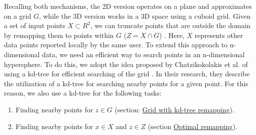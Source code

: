 Recalling both mechanisms, the 2D version operates on a plane and approximates on a grid $G$, while the 3D version works in a 3D space using a cuboid grid.
Given a set of input points $X \subset R^2$, we can truncate points that are outside the domain by remapping them to points within $G$ ($Z = X \cap G$) \citep{DBLP:journals/corr/abs-1212-1984}.
Here, $X$ represents other data points reported locally by the same user.
To extend this approach to n-dimensional data, we need an efficient way to search points in an n-dimensional hypersphere.
To do this, we adopt the idea proposed by Chatzikokolakis et al. of using a kd-tree for efficient searching of the grid \citep{chatzikokolakis_efficient_2017}.
In their research, they describe the utilization of a kd-tree for searching nearby points for a given point.
For this reason, we also use a kd-tree for the following tasks:
\begin{enumerate}
  \item Finding nearby points for $z \in G$ (section: \hyperref[theory:grid-remapping]{Grid with kd-tree remapping}).
  \item Finding nearby points for $x \in X$ and $z \in Z$ (section \hyperref[theory:optimal-remapping]{Optimal remapping}).
\end{enumerate}

